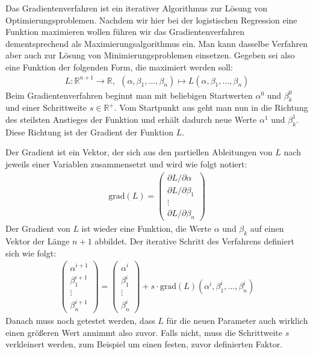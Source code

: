 Das Gradientenverfahren ist ein iterativer Algorithmus zur Lösung von Optimierungsproblemen. Nachdem wir hier bei der logistischen Regression eine Funktion maximieren wollen führen wir das Gradientenverfahren dementsprechend als Maximierungsalgorithmus ein. Man kann dasselbe Verfahren aber auch zur Lösung von Minimierungsproblemen einsetzen. Gegeben sei also eine Funktion der folgenden Form, die maximiert werden soll:
\begin{align*}
    L: \mathbb{R}^{n+1} \rightarrow \mathbb{R},~~ (\alpha, \beta_1, \dots, \beta_n) \mapsto L(\alpha, \beta_1, \dots, \beta_n)
\end{align*}
Beim Gradientenverfahren beginnt man mit beliebigen Startwerten $\alpha^0$ und $\beta_k^0$ und einer Schrittweite $s \in \mathbb{R}^+$. Vom Startpunkt aus geht man nun in die Richtung des steilsten Anstieges der Funktion und erhält dadurch neue Werte $\alpha^1$ und $\beta_k^1$. Diese Richtung ist der Gradient der Funktion $L$.

Der Gradient ist ein Vektor, der sich aus den partiellen Ableitungen von $L$ nach jeweils einer Variablen zusammensetzt und wird wie folgt notiert:
\begin{align*}
    \text{grad}(L) = \begin{pmatrix}
        \partial L / \partial \alpha \\
        \partial L / \partial \beta_1 \\
        \vdots \\
        \partial L / \partial \beta_n
    \end{pmatrix}
\end{align*}
Der Gradient von $L$ ist wieder eine Funktion, die Werte $\alpha$ und $\beta_k$ auf einen Vektor der Länge $n+1$ abbildet. Der iterative Schritt des Verfahrens definiert sich wie folgt:
\begin{align*}
    \begin{pmatrix}
        \alpha^{i + 1} \\
        \beta_1^{i + 1} \\
        \vdots \\
        \beta_n^{i + 1}
    \end{pmatrix} = \begin{pmatrix}
        \alpha^i \\
        \beta_1^i \\
        \vdots \\
        \beta_n^i
    \end{pmatrix} + s \cdot \text{grad}(L) (\alpha^i, \beta_1^i, \dots, \beta_n^i)
\end{align*}
Danach muss noch getestet werden, dass $L$ für die neuen Parameter auch wirklich einen größeren Wert annimmt also zuvor. Falls nicht, muss die Schrittweite $s$ verkleinert werden, zum Beispiel um einen festen, zuvor definierten Faktor.

